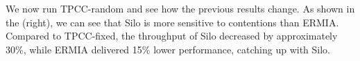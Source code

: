 We now run TPCC-random and see how the previous results change. As shown in the  (right), we can see that Silo is more sensitive to contentions than ERMIA. Compared to TPCC-fixed, the throughput of Silo decreased by approximately 30\%, while ERMIA delivered 15\% lower performance, catching up with Silo.
%
